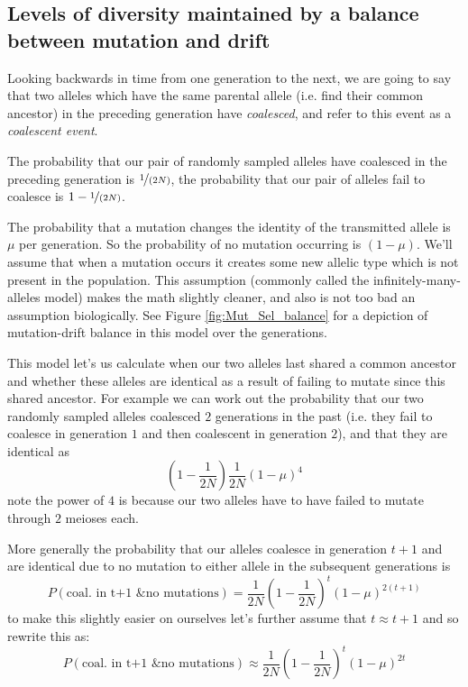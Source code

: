 \subsection{Levels of diversity maintained by a balance between
 mutation and drift} \label{DriftMutationBalance}

Looking backwards in time from one generation to the next, we are going to say
that two alleles which have the same parental allele (i.e. find their common
ancestor) in the preceding generation have \emph{coalesced}, and refer to this
event as a \emph{coalescent event}.

The probability that our pair of randomly sampled alleles have coalesced in the
preceding generation is $\nicefrac{1}{(2N)}$, the probability that our pair of
alleles fail to coalesce is $1-\nicefrac{1}{(2N)}$. 

The probability that a mutation changes the identity of the
transmitted allele is $\mu$ per generation. So the probability of no
mutation occurring is $(1-\mu)$. We'll assume that when a mutation
occurs it creates some new allelic type which is not present in the
population. This assumption (commonly called the infinitely-many-alleles model) makes the math slightly cleaner, and also
is not too bad an assumption biologically. See Figure
\ref{fig:Mut_Sel_balance} for a depiction of mutation-drift balance in
this model over the generations.

This model let's us calculate when our two alleles last shared a common
ancestor and whether these alleles are identical as a result of
failing to mutate since this shared ancestor.  For example we can work out the probability that our
two randomly sampled alleles coalesced $2$ generations in the past
(i.e. they fail to coalesce in generation $1$ and then coalescent in
generation $2$), and
that they are identical as
\begin{equation}
\left(1- \frac{1}{2N} \right) \frac{1}{2N} (1-\mu)^4
\end{equation}
note the power of $4$ is because our two alleles have to have failed
to mutate through $2$ meioses each. 

More generally the probability that our alleles coalesce in generation
$t+1$ and are identical due to no mutation to either allele in the
subsequent generations is
%
\begin{equation}
P(\textrm{coal. in t+1 \& no mutations}) =  \frac{1}{2N} \left(1- \frac{1}{2N} \right)^t \left(1-\mu \right)^{2(t+1)}
\end{equation}
%
to make this slightly easier on ourselves let's further assume that $t
\approx t+1$ and so rewrite this as:
\begin{equation}
P(\textrm{coal. in t+1 \& no mutations}) \approx \frac{1}{2N} \left(1- \frac{1}{2N} \right)^t \left(1-\mu \right)^{2t}
\end{equation}
%

